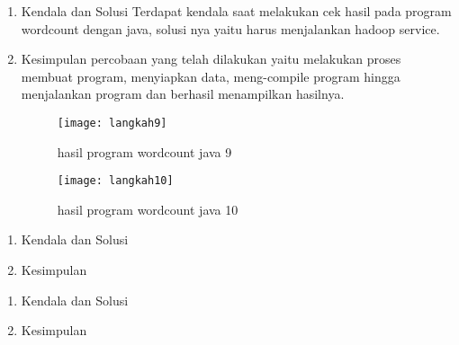\begin{enumerate}
\item Kendala dan Solusi
Terdapat kendala saat melakukan cek hasil pada program wordcount dengan java, solusi nya yaitu harus menjalankan hadoop service. 

\item Kesimpulan
percobaan yang telah dilakukan yaitu melakukan proses membuat program, menyiapkan data, meng-compile program hingga menjalankan program dan berhasil menampilkan hasilnya.
\begin{figure}[!ht]
\texttt{[image: langkah9]}
\caption{hasil program wordcount java 9}
\label{gam:hasil}
\end{figure}
\begin{figure}[!ht]
\texttt{[image: langkah10]}
\caption{hasil program wordcount java 10}
\label{gam:hasil}
\end{figure}

\end{enumerate}


\begin{enumerate}
\item Kendala dan Solusi

\item Kesimpulan

\end{enumerate}

\begin{enumerate}
\item Kendala dan Solusi

\item Kesimpulan

\end{enumerate}